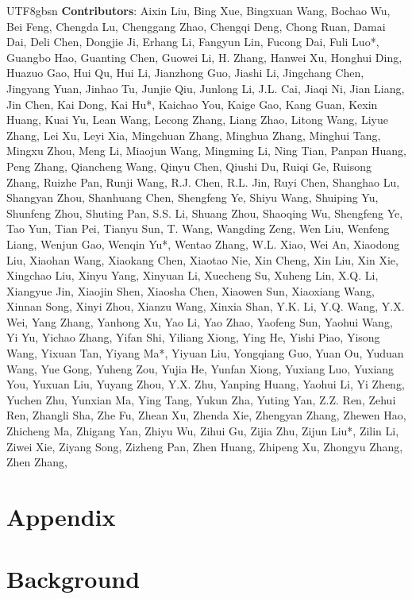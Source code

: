 \documentclass[11pt, a4paper, logo, copyright, nonumbering]{deepseek}
\begin{document}
\begin{CJK*}{UTF8}{gbsn}
\textbf{ Contributors}:
 Aixin Liu,
 Bing Xue,
 Bingxuan Wang,
 Bochao Wu,
 Bei Feng,
 Chengda Lu,
 Chenggang Zhao,
 Chengqi Deng,
 Chong Ruan,
 Damai Dai,
 Deli Chen,
 Dongjie Ji,
 Erhang Li,
 Fangyun Lin,
 Fucong Dai,
 Fuli Luo*,
 Guangbo Hao,
 Guanting Chen,
 Guowei Li,
 H. Zhang,
 Hanwei Xu,
 Honghui Ding,
 Huazuo Gao,
 Hui Qu,
 Hui Li,
 Jianzhong Guo,
 Jiashi Li,
 Jingchang Chen,
 Jingyang Yuan,
 Jinhao Tu,
 Junjie Qiu,
 Junlong Li,
 J.L. Cai,
 Jiaqi Ni,
 Jian Liang,
 Jin Chen,
 Kai Dong,
 Kai Hu*,
 Kaichao You,
 Kaige Gao,
 Kang Guan,
 Kexin Huang,
 Kuai Yu,
 Lean Wang,
 Lecong Zhang,
 Liang Zhao,
 Litong Wang,
 Liyue Zhang,
 Lei Xu,
 Leyi Xia,
 Mingchuan Zhang,
 Minghua Zhang,
 Minghui Tang,
 Mingxu Zhou,
 Meng Li,
 Miaojun Wang,
 Mingming Li,
 Ning Tian,
 Panpan Huang,
 Peng Zhang,
 Qiancheng Wang,
 Qinyu Chen,
 Qiushi Du,
 Ruiqi Ge,
 Ruisong Zhang,
 Ruizhe Pan,
 Runji Wang,
 R.J. Chen,
 R.L. Jin,
 Ruyi Chen,
 Shanghao Lu,
 Shangyan Zhou,
 Shanhuang Chen,
 Shengfeng Ye,
 Shiyu Wang,
 Shuiping Yu,
 Shunfeng Zhou,
 Shuting Pan,
 S.S. Li,
 Shuang Zhou,
 Shaoqing Wu,
 Shengfeng Ye,
 Tao Yun,
 Tian Pei,
 Tianyu Sun,
 T. Wang,
 Wangding Zeng,
 Wen Liu,
 Wenfeng Liang,
 Wenjun Gao,
 Wenqin Yu*,
 Wentao Zhang,
 W.L. Xiao,
 Wei An,
 Xiaodong Liu,
 Xiaohan Wang,
 Xiaokang Chen,
 Xiaotao Nie,
 Xin Cheng,
 Xin Liu,
 Xin Xie,
 Xingchao Liu,
 Xinyu Yang,
 Xinyuan Li,
 Xuecheng Su,
 Xuheng Lin,
 X.Q. Li,
 Xiangyue Jin,
 Xiaojin Shen,
 Xiaosha Chen,
 Xiaowen Sun,
 Xiaoxiang Wang,
 Xinnan Song,
 Xinyi Zhou,
 Xianzu Wang,
 Xinxia Shan,
 Y.K. Li,
 Y.Q. Wang,
 Y.X. Wei,
 Yang Zhang,
 Yanhong Xu,
 Yao Li,
 Yao Zhao,
 Yaofeng Sun,
 Yaohui Wang,
 Yi Yu,
 Yichao Zhang,
 Yifan Shi,
 Yiliang Xiong,
 Ying He,
 Yishi Piao,
 Yisong Wang,
 Yixuan Tan,
 Yiyang Ma*,
 Yiyuan Liu,
 Yongqiang Guo,
 Yuan Ou,
 Yuduan Wang,
 Yue Gong,
 Yuheng Zou,
 Yujia He,
 Yunfan Xiong,
 Yuxiang Luo,
 Yuxiang You,
 Yuxuan Liu,
 Yuyang Zhou,
 Y.X. Zhu,
 Yanping Huang,
 Yaohui Li,
 Yi Zheng,
 Yuchen Zhu,
 Yunxian Ma,
 Ying Tang,
 Yukun Zha,
 Yuting Yan,
 Z.Z. Ren,
 Zehui Ren,
 Zhangli Sha,
 Zhe Fu,
 Zhean Xu,
 Zhenda Xie,
 Zhengyan Zhang,
 Zhewen Hao,
 Zhicheng Ma,
 Zhigang Yan,
 Zhiyu Wu,
 Zihui Gu,
 Zijia Zhu,
 Zijun Liu*,
 Zilin Li,
 Ziwei Xie,
 Ziyang Song,
 Zizheng Pan,
 Zhen Huang,
 Zhipeng Xu,
 Zhongyu Zhang,
 Zhen Zhang,

\newpage
\appendix
\section*{Appendix}
\section{Background}

\end{CJK*}
\end{document}
